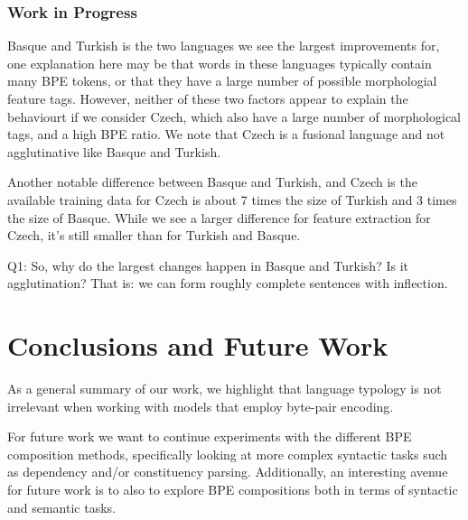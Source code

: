 \documentclass[11pt]{article}
\begin{document}
    \subsubsection{Work in Progress}

        Basque and Turkish is the two languages we see the largest
     improvements for, one explanation here may be that words in these
     languages typically contain many BPE tokens, or that they have a
     large number of possible morphologial feature tags.  However,
     neither of these two factors appear to explain the behaviourt if
     we consider Czech, which also have a large number of
     morphological tags, and a high BPE ratio. We note that Czech is a
     fusional language and not agglutinative like Basque and Turkish.

            Another notable difference between Basque and Turkish, and
     Czech is the available training data for Czech is about 7 times
     the size of Turkish and 3 times the size of Basque.  While we see
     a larger difference for feature extraction for Czech, it's still
     smaller than for Turkish and Basque.

        Q1: So, why do the largest changes happen in Basque and
     Turkish? Is it agglutination? That is: we can form roughly
     complete sentences with inflection.
    
    
    

    
    \section{Conclusions and Future Work}
        	As a general summary of our work, we highlight that
     language typology is not irrelevant when working with models that
     employ byte-pair encoding.

            For future work we want to continue experiments with the
     different BPE composition methods, specifically looking at more
     complex syntactic tasks such as dependency and/or constituency
     parsing. Additionally, an interesting avenue for future work is
     to also to explore BPE compositions both in terms of syntactic
     and semantic tasks.
    
	
	
	
	
	
\end{document}
